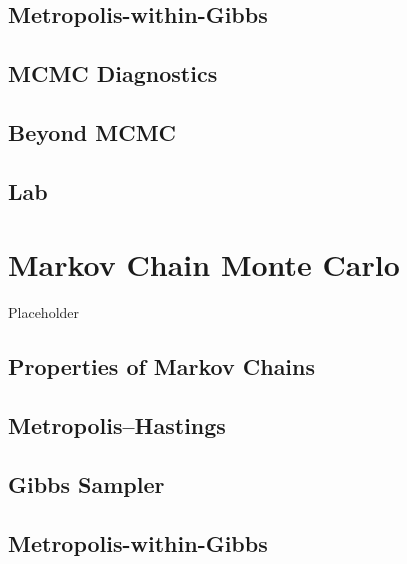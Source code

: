 \documentclass[
]{book}
\begin{document}
\hypertarget{metropolis-within-gibbs}{%
\section{Metropolis-within-Gibbs}\label{metropolis-within-gibbs}}

\hypertarget{mcmc-diagnostics}{%
\section{MCMC Diagnostics}\label{mcmc-diagnostics}}

\hypertarget{beyond-mcmc}{%
\section{Beyond MCMC}\label{beyond-mcmc}}

\hypertarget{lab-2}{%
\section{Lab}\label{lab-2}}

\hypertarget{markov-chain-monte-carlo-1}{%
\chapter{Markov Chain Monte Carlo}\label{markov-chain-monte-carlo-1}}

Placeholder

\hypertarget{properties-of-markov-chains-1}{%
\section{Properties of Markov Chains}\label{properties-of-markov-chains-1}}

\hypertarget{metropolishastings-1}{%
\section{Metropolis--Hastings}\label{metropolishastings-1}}

\hypertarget{gibbs-sampler-1}{%
\section{Gibbs Sampler}\label{gibbs-sampler-1}}

\hypertarget{metropolis-within-gibbs-1}{%
\section{Metropolis-within-Gibbs}\label{metropolis-within-gibbs-1}}
\end{document}
